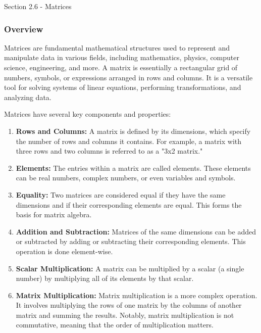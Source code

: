 \begin{notes}{Section 2.6 - Matrices}
    \subsubsection*{Overview}

    Matrices are fundamental mathematical structures used to represent and manipulate data in various fields, including mathematics, physics, computer science, engineering, and more. A matrix is 
    essentially a rectangular grid of numbers, symbols, or expressions arranged in rows and columns. It is a versatile tool for solving systems of linear equations, performing transformations, 
    and analyzing data. \vspace*{1em}
    
    Matrices have several key components and properties:
    
    \begin{enumerate}
        \item \textbf{Rows and Columns:} A matrix is defined by its dimensions, which specify the number of rows and columns it contains. For example, a matrix with three rows and two columns is 
        referred to as a "3x2 matrix."
    
        \item \textbf{Elements:} The entries within a matrix are called elements. These elements can be real numbers, complex numbers, or even variables and symbols.
    
        \item \textbf{Equality:} Two matrices are considered equal if they have the same dimensions and if their corresponding elements are equal. This forms the basis for matrix algebra.
    
        \item \textbf{Addition and Subtraction:} Matrices of the same dimensions can be added or subtracted by adding or subtracting their corresponding elements. This operation is done element-wise.
    
        \item \textbf{Scalar Multiplication:} A matrix can be multiplied by a scalar (a single number) by multiplying all of its elements by that scalar.
    
        \item \textbf{Matrix Multiplication:} Matrix multiplication is a more complex operation. It involves multiplying the rows of one matrix by the columns of another matrix and summing the 
        results. Notably, matrix multiplication is not commutative, meaning that the order of multiplication matters.
    

\end{enumerate}
\end{notes}
